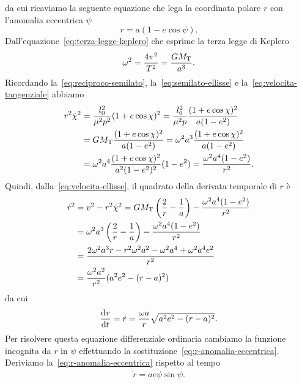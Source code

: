 da cui ricaviamo la seguente equazione che lega la coordinata polare $r$ con
l'anomalia eccentrica $\psi$
\begin{equation}
  \label{eq:r-anomalia-eccentrica}
  r = a(1 - e\cos\psi).
\end{equation}
Dall'equazione~\eqref{eq:terza-legge-keplero} che esprime la terza legge di
Keplero
\begin{equation}
  \omega^2 = \frac{4\pi^2}{T^2} = \frac{GM_\textup{T}}{a^3}.
\end{equation}
Ricordando la~\eqref{eq:reciproco-semilato}, la~\eqref{eq:semilato-ellisse} e
la~\eqref{eq:velocita-tangenziale} abbiamo
\begin{equation}
  \begin{split}
    r^2\dot{\chi}^2 &= \frac{l_0^2}{\mu^2p^2}(1 + e\cos\chi)^2 =
    \frac{l_0^2}{\mu^2p} \frac{(1+e\cos\chi)^2}{a(1-e^2)} \\
    &= GM_\textup{T} \frac{(1+e\cos\chi)^2}{a(1-e^2)} = \omega^2a^3
    \frac{(1+e\cos\chi)^2}{a(1-e^2)} \\
    &= \omega^2a^4 \frac{(1+e\cos\chi)^2}{a^2(1-e^2)^2}(1-e^2) =
    \frac{\omega^2a^4(1-e^2)}{r^2}.
  \end{split}
\end{equation}
Quindi, dalla~\eqref{eq:velocita-ellisse}, il quadrato della derivata temporale
di $r$ è
\begin{equation}
  \begin{split}
    \dot{r}^2 &= v^2 - r^2\dot{\chi}^2 = GM_\textup{T}
    \left(
      \frac{2}{r} - \frac{1}{a}
    \right) - \frac{\omega^2a^4(1-e^2)}{r^2} \\
        &= \omega^2a^3
    \left(
      \frac{2}{r} - \frac{1}{a}
    \right) - \frac{\omega^2a^4(1-e^2)}{r^2} \\
    &= \frac{2\omega^2a^3r-r^2\omega^2a^2-\omega^2a^4+\omega^2a^4e^2}{r^2}\\
    &= \frac{\omega^2a^2}{r^2}(a^2e^2-(r-a)^2)
  \end{split}
\end{equation}
da cui
\begin{equation}
  \frac{{\mathop{}\!\mathrm{d}^{}}r}{\mathop{}\!\mathrm{d} {t}^{}} = \dot{r} = \frac{\omega a}{r}\sqrt{a^2e^2 - (r-a)^2}.
\end{equation}
Per risolvere questa equazione differenziale ordinaria cambiamo la funzione
incognita da $r$ in $\psi$ effettuando la
sostituzione~\eqref{eq:r-anomalia-eccentrica}. Deriviamo
la~\eqref{eq:r-anomalia-eccentrica} rispetto al tempo
\begin{equation}
  \dot{r} = ae\dot{\psi}\sin\psi.
\end{equation}
